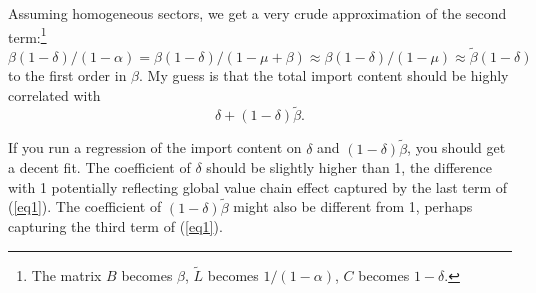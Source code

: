 \documentclass[A4]{article}
\begin{document}
Assuming homogeneous sectors, we get a very crude approximation of the
second term:\footnote{The matrix $B$ becomes $\beta$, $\tilde L$
  becomes $1/(1-\alpha)$, $C$ becomes $1-\delta$.}
$\beta(1-\delta)/(1-\alpha)=\beta(1-\delta)/(1-\mu+\beta)\approx\beta(1-\delta)/(1-\mu)\approx\tilde\beta(1-\delta)$
to the first order in $\beta$. My
guess is that the total import content should be highly correlated
with
\begin{equation*}
  \delta + (1-\delta)\tilde{\beta}.
\end{equation*}

If you run a regression of the import content on $\delta$ and
$(1-\delta)\tilde\beta$, you should get a decent fit. The coefficient
of $\delta$ should be slightly higher than 1, the difference with 1
potentially reflecting global value chain effect captured by the last
term of (\ref{eq1}). The coefficient of $(1-\delta)\tilde\beta$ might
also be different from 1, perhaps capturing the third term of (\ref{eq1}).
\end{document}
